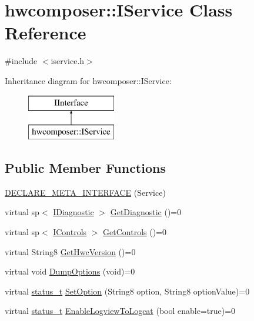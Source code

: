 \hypertarget{classhwcomposer_1_1IService}{}\section{hwcomposer\+:\+:I\+Service Class Reference}
\label{classhwcomposer_1_1IService}


{\ttfamily \#include $<$iservice.\+h$>$}

Inheritance diagram for hwcomposer\+:\+:I\+Service\+:\begin{figure}[H]
\begin{center}
\leavevmode
\includegraphics[height=2.000000cm]{classhwcomposer_1_1IService}
\end{center}
\end{figure}
\subsection*{Public Member Functions}
\begin{DoxyCompactItemize}
\item 
\mbox{\hyperlink{classhwcomposer_1_1IService_ad6bc53970c36eb2060aef96616c97367}{D\+E\+C\+L\+A\+R\+E\+\_\+\+M\+E\+T\+A\+\_\+\+I\+N\+T\+E\+R\+F\+A\+CE}} (Service)
\item 
virtual sp$<$ \mbox{\hyperlink{classhwcomposer_1_1IDiagnostic}{I\+Diagnostic}} $>$ \mbox{\hyperlink{classhwcomposer_1_1IService_ab8408be3aeef35ceef24739d85ca80fc}{Get\+Diagnostic}} ()=0
\item 
virtual sp$<$ \mbox{\hyperlink{classhwcomposer_1_1IControls}{I\+Controls}} $>$ \mbox{\hyperlink{classhwcomposer_1_1IService_a88d42bf367d37d06ef71f9eab33da2d7}{Get\+Controls}} ()=0
\item 
virtual String8 \mbox{\hyperlink{classhwcomposer_1_1IService_a74bd053098590c03cf3e374f396222f8}{Get\+Hwc\+Version}} ()=0
\item 
virtual void \mbox{\hyperlink{classhwcomposer_1_1IService_a5a418c67d99e61ad226210ad22bfa765}{Dump\+Options}} (void)=0
\item 
virtual \mbox{\hyperlink{hwcserviceapi_8h_a3806fb2027d9a316d8ca8d9b8b8eb96f}{status\+\_\+t}} \mbox{\hyperlink{classhwcomposer_1_1IService_a72bf2c3bbfbeeb72a2d1a4cbaadc97b7}{Set\+Option}} (String8 option, String8 option\+Value)=0
\item 
virtual \mbox{\hyperlink{hwcserviceapi_8h_a3806fb2027d9a316d8ca8d9b8b8eb96f}{status\+\_\+t}} \mbox{\hyperlink{classhwcomposer_1_1IService_aaddf58a1f2b64b1a05f7f68259b6c1f3}{Enable\+Logview\+To\+Logcat}} (bool enable=true)=0
\end{DoxyCompactItemize}


